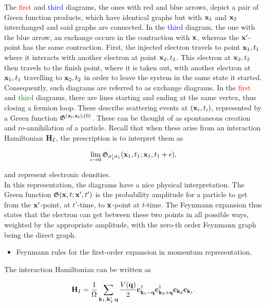 \documentclass{homework}
\begin{document}
The \textcolor{red}{first} and \textcolor{blue}{third} diagrams, the ones with red and blue arrows, depict a pair of Green function products, which have identical graphs but with ${\bf x}_1$ and ${\bf x}_2$ interchanged and said graphs are connected. In the \textcolor{blue}{third} diagram, the one with the blue arrow, an exchange occurs in the contraction with ${\bf x}$, whereas the ${\bf x'}$-point has the same contraction. First, the injected electron travels to point ${\bf x}_1, t_1$ where it interacts with another electron at point ${\bf x}_2, t_2$. This electron at ${\bf x}_2, t_2$ then travels to the finish point, where it is taken out, with another electron at ${\bf x}_1, t_1$ travelling to ${\bf x}_2, t_2$ in order to leave the system in the same state it started. Consequently, such diagrams are referred to as exchange diagrams. In the \textcolor{red}{first} and \textcolor{green}{third} diagrams, there are lines starting and ending at the same vertex, thus closing a fermion loop. These describe scattering events at $({\bf x}_i, t_i)$, represented by a Green function $\mathfrak{G}^{({\bf x_i, x_i});(0)}$. These can be thought of as spontaneous creation and re-annihilation of a particle. Recall that when these arise from an interaction Hamiltonian ${\bf H}_I$, the prescription is to interpret them as 

$$
    \lim_{\epsilon \rightarrow 0} \mathfrak{G}_{\sigma'_1 \sigma_1} ({\bf x}_1, t_1; {\bf x}_1, t_1+\epsilon),
$$

and represent electronic densities. \\

In this representation, the diagrams have a nice physical interpretation. The Green function $\mathfrak{G}({\bf x}, t; {\bf x}',t')$ is the probability amplitude for a particle to get from the ${\bf x}'$-point, at $t'$-time, to ${\bf x}$-point at $t$-time. The Feynmann expansion thus states that the electron can get between these two points in all possible ways, weighted by the appropriate amplitude, with the zero-th order Feynmann graph being the direct graph. \\

\begin{itemize}
    \item Feynmann rules for the first-order expansion in momentum representation.
\end{itemize}

The interaction Hamiltonian can be written as 

\begin{equation}
    {\bf H}_I = \frac{1}{\Omega}\sum_{{\bf k}_1, {\bf k}'_1, {\bf q}} \frac{V({\bf q)}}{2} {\bf c}_{{\bf k}_1 - {\bf q}}^\dagger {\bf c}_{{\bf k}_2 + {\bf q}}^\dagger {\bf c}_{{\bf k}_2}{\bf c}_{{\bf k}_1}.
\end{equation}
\end{document}
